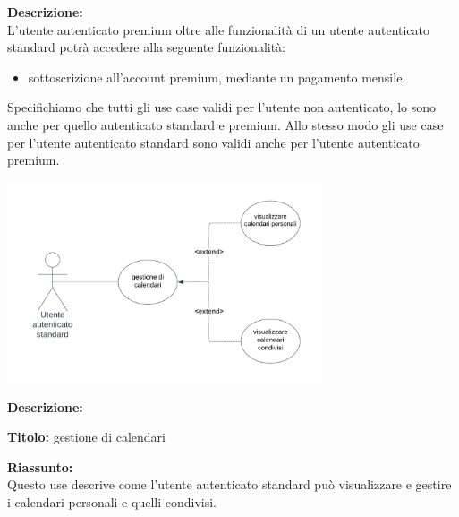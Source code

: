 \begin{listaPersonale}[UC]{}
\begin{listaPersonale2} [UC] {}
        \textbf{Descrizione:} \\
        L'utente autenticato premium oltre alle funzionalità di un utente autenticato standard potrà accedere alla seguente funzionalità:
        \begin{itemize}
            \item sottoscrizione all'account premium, mediante un pagamento mensile.
        \end{itemize}
    \end{listaPersonale2}
    Specifichiamo che tutti gli use case validi per l'utente non autenticato, lo sono anche per quello autenticato standard e premium. Allo stesso modo gli use case per l'utente autenticato standard sono validi anche per l'utente autenticato premium.
    \newpage



    \begin{center}
        \includegraphics[width=0.7\textwidth]{img/Diagrammi/UseCases/CondivisioneCalendario.png}
    \end{center}

    \textbf{Descrizione:}

    \textbf{Titolo:} gestione di calendari

    \textbf{Riassunto:} \\
    Questo use descrive come l'utente autenticato standard può visualizzare e gestire i calendari personali e quelli condivisi.


\end{listaPersonale}
